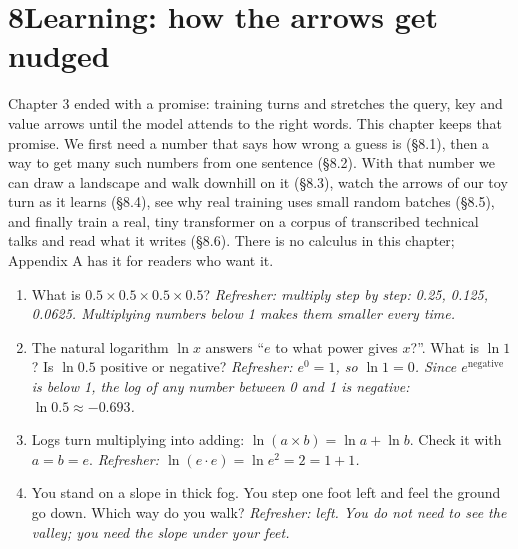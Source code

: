\newpage
\section*{8\quad Learning: how the arrows get nudged}
\providecommand{\fitR}[1]{\leavevmode\setbox0\hbox{#1}\ifdim\wd0>\linewidth\resizebox{\linewidth}{!}{\box0}\else\box0\fi}

\begin{chaptermap}
Chapter 3 ended with a promise: training turns and stretches the query, key and value arrows until the
model attends to the right words. This chapter keeps that promise. We first need a number that says how
wrong a guess is (\S8.1), then a way to get many such numbers from one sentence (\S8.2). With that number we
can draw a landscape and walk downhill on it (\S8.3), watch the arrows of our toy turn as it learns (\S8.4),
see why real training uses small random batches (\S8.5), and finally train a real, tiny transformer on a corpus
of transcribed technical talks and read what it writes (\S8.6). There is no calculus in this chapter; Appendix A has it
for readers who want it.
\end{chaptermap}


\begin{beforeyoustart}
\begin{enumerate}[label=(\arabic*),leftmargin=1.6em]
\item What is $0.5\times0.5\times0.5\times0.5$? \emph{Refresher: multiply step by step: 0.25, 0.125,
0.0625. Multiplying numbers below 1 makes them smaller every time.}
\item The natural logarithm $\ln x$ answers ``$e$ to what power gives $x$?''. What is $\ln 1$? Is $\ln 0.5$
positive or negative? \emph{Refresher: $e^0=1$, so $\ln 1=0$. Since $e^{\text{negative}}$ is below 1,
the log of any number between 0 and 1 is negative: $\ln 0.5\approx-0.693$.}
\item Logs turn multiplying into adding: $\ln(a\times b)=\ln a+\ln b$. Check it with $a=b=e$.
\emph{Refresher: $\ln(e\cdot e)=\ln e^2=2=1+1$.}
\item You stand on a slope in thick fog. You step one foot left and feel the ground go down. Which way do
you walk? \emph{Refresher: left. You do not need to see the valley; you need the slope under your feet.}
\end{enumerate}
\end{beforeyoustart}

